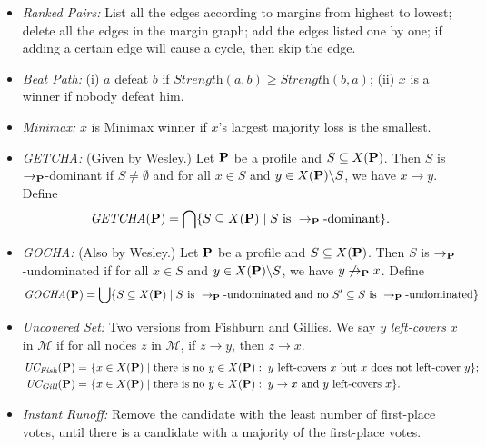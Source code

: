 \begin{itemize}
    \item \emph{Ranked Pairs:} List all the edges according to margins from highest to lowest; delete all the edges in the margin graph; add the edges listed one by one; if adding a certain edge will cause a cycle, then skip the edge.
    \item \emph{Beat Path:} (i) $a$ defeat $b$ if $\textit{Strength}(a,b) \geq \textit{Strength}(b,a)$; (ii) $x$ is a winner if nobody defeat him.
    \item \emph{Minimax:} $x$ is Minimax winner if $x$'s largest majority loss is the smallest.
    \item \emph{GETCHA:} (Given by Wesley.) Let $\mathbf{P}$ be a profile and $S \subseteq X(\mathbf{P})$. Then $S$ is $\to_{\mathbf{P}}$-dominant if $S \neq \emptyset$ and for all $x \in S$ and $y \in X(\mathbf{P}) \backslash S$, we have $x \to y$. Define
    \[\textit{GETCHA}(\mathbf{P}) = \bigcap \{S \subseteq X(\mathbf{P})\;|\; S \mbox{ is }\to_{\mathbf{P}} \mbox{-dominant}\}.\]
    \item \emph{GOCHA:} (Also by Wesley.) Let $\mathbf{P}$ be a profile and $S \subseteq X(\mathbf{P})$. Then $S$ is $\to_{\mathbf{P}}$-undominated if for all $x \in S$ and $y \in X(\mathbf{P}) \backslash S$, we have $y \not \to_{\mathbf{P}} x$. Define
    \[\textit{GOCHA}(\mathbf{P}) = \bigcup\{S \subseteq X(\mathbf{P})\;|\; S \mbox{ is } \to_{\mathbf{P}} \mbox{-undominated and no } S' \subseteq S \mbox{ is } \to_{\mathbf{P}} \mbox{-undominated}\}\]
    \item \emph{Uncovered Set:} Two versions from Fishburn and Gillies. We say $y$ \emph{left-covers} $x$ in $\mathcal{M}$ if for all nodes $z$ in $\mathcal{M}$, if $z \to y$, then $z \to x$.
    \begin{align*}
        \textit{UC}_\textit{Fish} (\mathbf{P}) = &\  \{x \in X(\mathbf{P})\;|\; \mbox{there is no } y \in X(\mathbf{P}):\; y \mbox{ left-covers }x \mbox{ but } x \mbox{ does not left-cover } y\}; \\
        \textit{UC}_\textit{Gill} (\mathbf{P}) = &\  \{x \in X(\mathbf{P})\;|\; \mbox{there is no } y \in X(\mathbf{P}):\; y \to x \mbox{ and } y \mbox{ left-covers } x\}.
    \end{align*}
    \item \emph{Instant Runoff:} Remove the candidate with the least number of first-place votes, until there is a candidate with a majority of the first-place votes.
\end{itemize}
